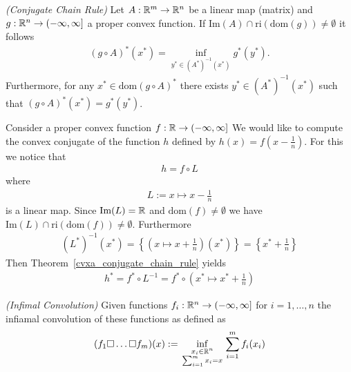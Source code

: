 \begin{theorem}
  \emph{(Conjugate Chain Rule)}
  \label{cvxa_conjugate_chain_rule}
  Let 
  $
    A:
      \mathbb{R}^m \to \mathbb{R}^n
  $
  be a linear map (matrix)
  and
  $
    g:
      \mathbb{R}^n \to (-\infty, \infty]
  $
  a proper convex function. If
  $
    \text{Im}(A) \cap \text{ri}(\text{dom}(g))
    \neq
    \emptyset
  $
  it follows
  \begin{gather}
    ( g \circ A )^* ( x^* )
    =
    \inf_
          { y^* \in ( A^* )^{ -1 } ( x^* )}
                                          g^*( y^* )
                                          .
  \end{gather}
  Furthermore, 
    for any 
      $
        x^* \in \text{dom}( g \circ A)^*
      $
        there exists
          $
            y^* \in ( A^* )^{ -1 } ( x^* )
          $
            such that
              $
                ( g \circ A)^* ( x^* )
                =
                g^*( y^* )
              $.
\end{theorem}
\begin{example}
  Consider a proper convex function
  $
    f:
    \mathbb{R} \to ( -\infty, \infty]
  $
  We would like to compute the convex conjugate of the function 
  $h$ defined by 
  $
    h(x) = f \left( x - \frac{1}{n} \right)
  $.
  For this we notice that
  \begin{gather*}
    h = f \circ L
  \end{gather*}
  where 
  \begin{gather*}
   L := x \mapsto x - \frac{1}{n} 
  \end{gather*}
  is a linear map.
  Since 
  $
    \text{Im}(L) = \mathbb{R}
  $
  and 
  $\text{dom}(f) \neq \emptyset$
  we have
  $
    \text{Im}(L) 
    \cap
    \text{ri}(\text{dom}(f) )
    \neq
    \emptyset
  $.
  Furthermore
  \begin{gather}
    (L^*)^{-1}(x^*)
    =
    \left\{ 
     \left( x \mapsto x + \frac{1}{n} \right) (x^*)
    \right\}
    =
    \left\{ x^* + \frac{1}{n} \right\}
  \end{gather}
  Then Theorem~\ref{cvxa_conjugate_chain_rule}
  yields
  \begin{gather}
    h^* = f^* \circ L^{-1} 
        =  f^* \circ  
        \left( x^* \mapsto x^* + \frac{1}{n} \right)
  \end{gather}

\end{example}


\begin{definition}
  \emph{(Infimal Convolution)}
  Given functions
  $
    f_i:
    \mathbb{R}^n \to (-\infty, \infty]
  $
  for $ i = 1, \ldots, n $
  the infiamal convolution of these functions as defined as
  \begin{gather}
    (f_1 \square \ldots \square f_m)(x)
    :=
    \inf_{
    \begin{smallmatrix}
      x_i \in \mathbb{R}^n \\
      \sum_{i = 1}^{m} 
        x_i
      =
      x
    \end{smallmatrix}
    }
    \sum_{i = 1}^{m}
      f_i(x_i)
  \end{gather}
\end{definition}


